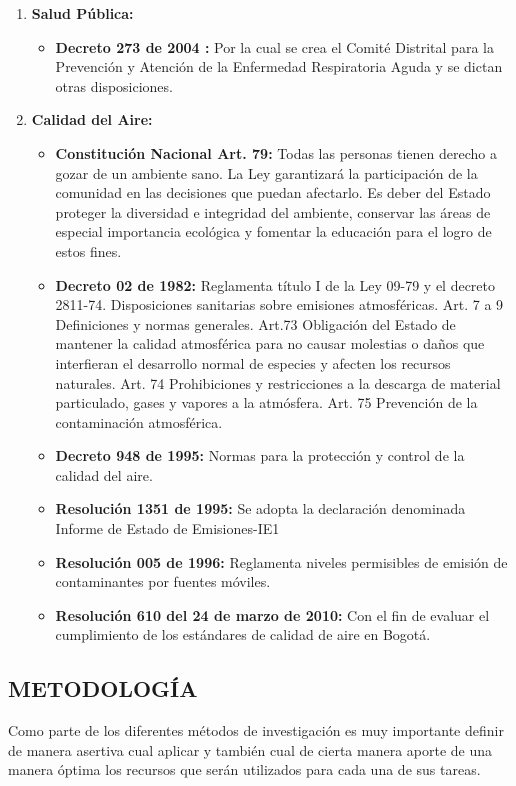 \documentclass[a4paper, 11pt, oneside]{article}
\theoremstyle{definition}
\theoremstyle{remark}
\begin{document}
\begin{enumerate}[I]
\begin{itemize}
	\end{itemize}
\item\textbf{Salud Pública:}
	\begin{itemize}
	\item\textbf{Decreto 273 de 2004 :} Por la cual se crea el Comité Distrital 	para la Prevención y Atención de la Enfermedad Respiratoria Aguda y se dictan 	  otras disposiciones.
	\end{itemize}
\item\textbf{Calidad del Aire:}
	\begin{itemize}
    \item\textbf{Constitución Nacional Art. 79: }  Todas las personas tienen 		derecho a gozar de un ambiente sano. La Ley garantizará la participación de 	la comunidad en las decisiones que puedan afectarlo. Es deber del Estado 		proteger la diversidad e integridad del ambiente, conservar las áreas de 		especial importancia ecológica y fomentar la educación para el logro de estos 	  fines.
    \item\textbf{Decreto 02 de 1982: } Reglamenta título I de la Ley 09-79 y el        decreto 2811-74. Disposiciones sanitarias sobre emisiones atmosféricas. Art. 	7 a 9 Definiciones y normas generales. Art.73 Obligación del Estado de 			mantener la calidad atmosférica para no causar molestias o daños que 			interfieran el desarrollo normal de especies y afecten los recursos 			naturales. Art. 74 Prohibiciones y restricciones a la descarga de material 		particulado, gases y vapores a la atmósfera. Art. 75 Prevención de la 			contaminación atmosférica.
    \item\textbf{Decreto 948 de 1995: } Normas para la protección y control de la 	   calidad del aire.
    \item\textbf{Resolución 1351 de 1995: } Se adopta la declaración denominada 	 Informe de Estado de Emisiones-IE1
    \item\textbf{Resolución 005 de 1996: } Reglamenta niveles permisibles de 		emisión de contaminantes por fuentes móviles.
    \item\textbf{Resolución 610 del 24 de marzo de 2010: } Con el fin de evaluar 	 el cumplimiento de los estándares de calidad de aire en Bogotá.
\end{itemize}
\end{enumerate}
\clearpage


\begin{center}
\section{METODOLOGÍA}

\end{center}
Como parte de los diferentes métodos de investigación es muy importante definir de manera asertiva cual aplicar y también cual  de cierta manera aporte de una manera óptima los recursos que serán utilizados para cada una de sus tareas.
\end{document}
